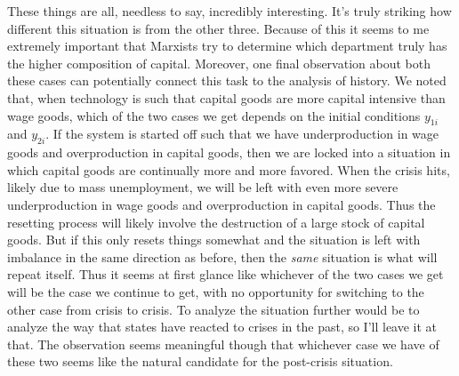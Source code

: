 \documentclass{article}
\theoremstyle{theorem}
\begin{document}
These things are all, needless to say, incredibly interesting. It's truly striking how different this situation is from the other three. Because of this it seems to me extremely important that Marxists try to determine which department truly has the higher composition of capital. Moreover, one final observation about both these cases can potentially connect this task to the analysis of history. We noted that, when technology is such that capital goods are more capital intensive than wage goods, which of the two cases we get depends on the initial conditions $y_{1i}$ and $y_{2i}$. If the system is started off such that we have underproduction in wage goods and overproduction in capital goods, then we are locked into a situation in which capital goods are continually more and more favored. When the crisis hits, likely due to mass unemployment, we will be left with even more severe underproduction in wage goods and overproduction in capital goods. Thus the resetting process will likely involve the destruction of a large stock of capital goods. But if this only resets things somewhat and the situation is left with imbalance in the same direction as before, then the \emph{same} situation is what will repeat itself. Thus it seems at first glance like whichever of the two cases we get will be the case we continue to get, with no opportunity for switching to the other case from crisis to crisis. To analyze the situation further would be to analyze the way that states have reacted to crises in the past, so I'll leave it at that. The observation seems meaningful though that whichever case we have of these two seems like the natural candidate for the post-crisis situation.
\par 
\end{document}
